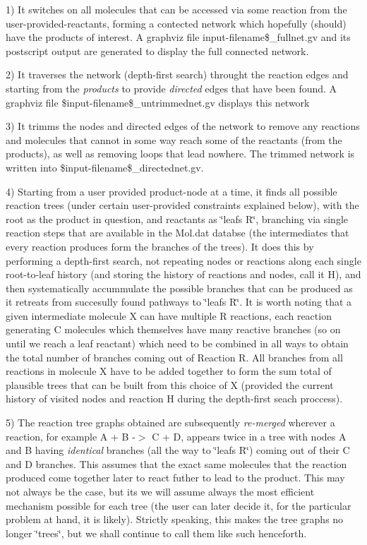 \begin{DoxyItemize}
\item 1) It switches on all molecules that can be accessed via some reaction from the user-\/provided-\/reactants, forming a contected network which hopefully (should) have the products of interest. A graphviz file input-\/filename\$\+\_\+fullnet.\+gv and its postscript output are generated to display the full connected network.
\item 2) It traverses the network (depth-\/first search) throught the reaction edges and starting from the {\itshape products} to provide {\itshape directed} edges that have been found. A graphviz file \$input-\/filename\$\+\_\+untrimmednet.\+gv displays this network
\item 3) It trimms the nodes and directed edges of the network to remove any reactions and molecules that cannot in some way reach some of the reactants (from the products), as well as removing loops that lead nowhere. The trimmed network is written into \$input-\/filename\$\+\_\+directednet.\+gv.
\item 4) Starting from a user provided product-\/node at a time, it finds all possible reaction trees (under certain user-\/provided constraints explained below), with the root as the product in question, and reactants as \char`\"{}leafs R\char`\"{}, branching via single reaction steps that are available in the Mol.\+dat databse (the intermediates that every reaction produces form the branches of the trees). It does this by performing a depth-\/first search, not repeating nodes or reactions along each single root-\/to-\/leaf history (and storing the history of reactions and nodes, call it H), and then systematically accummulate the possible branches that can be produced as it retreats from succesully found pathways to \char`\"{}leafs R\char`\"{}. It is worth noting that a given intermediate molecule X can have multiple R reactions, each reaction generating C molecules which themselves have many reactive branches (so on until we reach a leaf reactant) which need to be combined in all ways to obtain the total number of branches coming out of Reaction R. All branches from all reactions in molecule X have to be added together to form the sum total of plausible trees that can be built from this choice of X (provided the current history of visited nodes and reaction H during the depth-\/first seach proccess).
\item 5) The reaction tree graphs obtained are subsequently {\itshape re-\/merged} wherever a reaction, for example A + B -\/$>$ C + D, appears twice in a tree with nodes A and B having {\itshape identical} branches (all the way to \char`\"{}leafs R\char`\"{}) coming out of their C and D branches. This assumes that the exact same molecules that the reaction produced come together later to react futher to lead to the product. This may not always be the case, but its we will assume always the most efficient mechanism possible for each tree (the user can later decide it, for the particular problem at hand, it is likely). Strictly speaking, this makes the tree graphs no longer \char`\"{}trees\char`\"{}, but we shall continue to call them like such henceforth.
\end{DoxyItemize}

